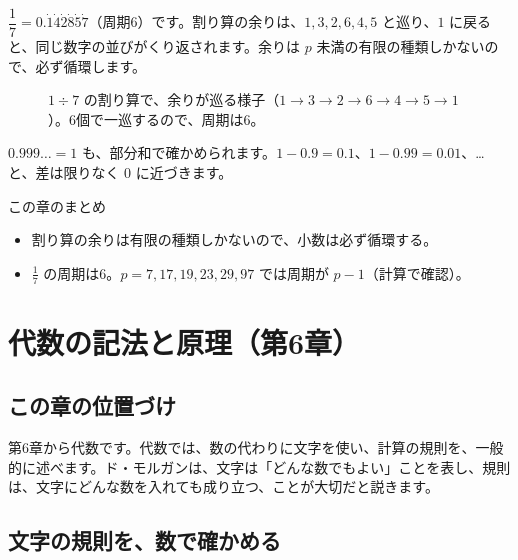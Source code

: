 \documentclass[a4paper,11pt,openany]{ltjsbook}
\begin{document}
$\dfrac17=0.\dot1\dot4\dot2\dot8\dot5\dot7$（周期6）です。割り算の余りは、$1,3,2,6,4,5$ と巡り、$1$ に戻ると、同じ数字の並びがくり返されます。余りは $p$ 未満の有限の種類しかないので、必ず循環します。

\begin{figure}[htbp]
\centering
{}
\caption{$1\div7$ の割り算で、余りが巡る様子（$1\to3\to2\to6\to4\to5\to1$）。6個で一巡するので、周期は6。}
\end{figure}

$0.999\ldots=1$ も、部分和で確かめられます。$1-0.9=0.1$、$1-0.99=0.01$、…と、差は限りなく $0$ に近づきます。

\begin{pointbox}{この章のまとめ}
\begin{itemize}[leftmargin=*]
\item 割り算の余りは有限の種類しかないので、小数は必ず循環する。
\item $\tfrac17$ の周期は6。$p=7,17,19,23,29,97$ では周期が $p-1$（計算で確認）。
\end{itemize}
\end{pointbox}

\chapter{代数の記法と原理（第6章）}

\section{この章の位置づけ}

第6章から代数です。代数では、数の代わりに文字を使い、計算の規則を、一般的に述べます。ド・モルガンは、文字は「どんな数でもよい」ことを表し、規則は、文字にどんな数を入れても成り立つ、ことが大切だと説きます。

\section{文字の規則を、数で確かめる}
\end{document}
